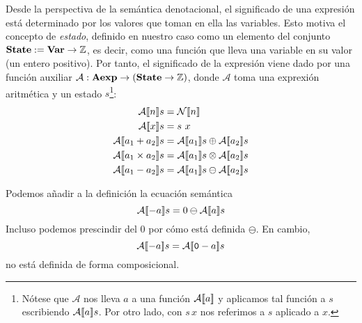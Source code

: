 Desde la perspectiva de la semántica denotacional, el significado de una expresión está determinado por los valores que toman en ella las variables. Esto motiva el concepto de \textit{estado}, definido en nuestro caso como un elemento del conjunto $\mathbf{State} := \mathbf{Var} \rightarrow \mathbb{Z}$, es decir, como una función que lleva una variable en su valor (un entero positivo). Por tanto, el significado de la expresión viene dado por una función auxiliar $\mathcal{A}: \mathbf{Aexp} \rightarrow (\mathbf{State}\rightarrow \mathbb{Z})$, donde $\mathcal{A}$ toma una exprexión aritmética y un estado $s$\footnote{Nótese que $\mathcal{A}$ nos lleva $a$ a una función $\mathcal{A}[\![a]\!]$ y aplicamos tal función a $s$ escribiendo $ \mathcal{A}[\![a]\!]s$. Por otro lado, con $s\, x$ nos referimos a $s$ aplicado a $x$.}:
\begin{align*}
    \fc{A}{n}s & = \fc{N}{n} \\
    \fc{A}{x}s & = s\ x \\ 
    \fc{A}{a_1 + a_2}s & = \fc{A}{a_1}s \oplus\fc{A}{a_2}s \\
    \fc{A}{a_1 \times a_2}s & = \fc{A}{a_1}s \otimes \fc{A}{a_2}s \\
     \fc{A}{a_1 - a_2}s & = \fc{A}{a_1}s \ominus \fc{A}{a_2}s 
\end{align*}


\begin{example}
Podemos añadir a la definición la ecuación semántica
$$\mathcal{A}[\![-a]\!]s = 0 \ominus \mathcal{A}[\![a]\!]s$$
Incluso podemos prescindir del $0$ por cómo está definida $\ominus$. En cambio,
$$\mathcal{A}[\![-a]\!]s  = \mathcal{A}[\![\texttt{0}-a]\!]s$$
no está definida de forma composicional.
\end{example}

